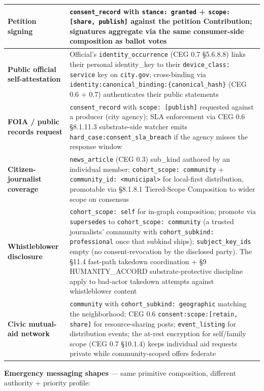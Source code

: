 \documentclass[11pt]{article}
\begin{document}
{\begin{longtable}{|p{8.0cm}|p{8.0cm}|}
\textbf{Petition signing} & \texttt{consent\_record} with \texttt{stance: granted} + \texttt{scope: [share, publish]} against the petition Contribution; signatures aggregate via the same consumer-side composition as ballot votes \\ \hline
\textbf{Public official self-attestation} & Official's \texttt{identity\_occurrence} (CEG 0.7 §5.6.8.8) links their personal identity\_key to their \texttt{device\_class: service} key on \texttt{city.gov}; cross-binding via \texttt{identity:canonical\_binding:\{canonical\_hash\}} (CEG 0.6 + 0.7) authenticates their public statements \\ \hline
\textbf{FOIA / public records request} & \texttt{consent\_record} with \texttt{scope: [publish]} requested against a producer (city agency); SLA enforcement via CEG 0.6 §8.1.11.3 substrate-side watcher emits \texttt{hard\_case:consent\_sla\_breach} if the agency misses the response window \\ \hline
\textbf{Citizen-journalist coverage} & \texttt{news\_article} (CEG 0.3) sub\_kind authored by an individual member; \texttt{cohort\_scope: community} + \texttt{community\_id: <municipal>} for local-first distribution, promotable via §8.1.8.1 Tiered-Scope Composition to wider scope on consensus \\ \hline
\textbf{Whistleblower disclosure} & \texttt{cohort\_scope: self} for in-graph composition; promote via \texttt{supersedes} to \texttt{cohort\_scope: community} (a trusted journalists' community with \texttt{cohort\_subkind: professional} once that subkind ships); \texttt{subject\_key\_ids} empty (no consent-revocation by the disclosed party). The §11.4 fast-path takedown coordination + §9 HUMANITY\_ACCORD substrate-protective discipline apply to bad-actor takedown attempts against whistleblower content \\ \hline
\textbf{Civic mutual-aid network} & \texttt{community} with \texttt{cohort\_subkind: geographic} matching the neighborhood; CEG 0.6 \texttt{consent:scope:[retain, share]} for resource-sharing posts; \texttt{event\_listing} for distribution events; the at-rest encryption for self/family scope (CEG 0.7 §10.1.4) keeps individual aid requests private while community-scoped offers federate \\ \hline
\end{longtable}}


\textbf{Emergency messaging shapes} — same primitive composition, different authority + priority profile:
\end{document}
